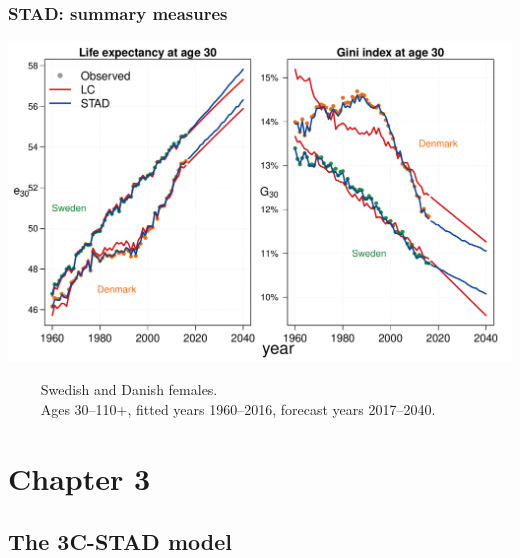 \documentclass[12pt, xcolor=table]{beamer}  %
\begin{document}
\begin{frame}[noframenumbering]\frametitle{STAD: summary measures}

\vspace{-0.5cm}
	
	
	\begin{center}	
		\vspace{0.4cm}
		
		\includegraphics[scale=.42]{Figures/Ch2/F4_3}
		
	\end{center}

\vspace{-0.3cm}
\tiny{$\quad\quad$ Swedish and Danish females. \\ $\quad\quad$ Ages 30--110+, fitted years 1960--2016, forecast years 2017--2040.}
	
\end{frame}

\section{Chapter 3}
\subsection{The 3C-STAD model}
\end{document}
